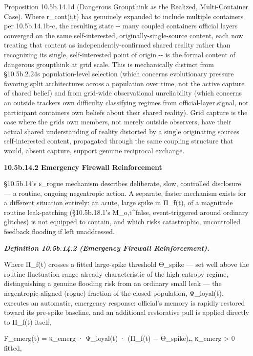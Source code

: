 \documentclass[
]{article}
\begin{document}
Proposition 10.5b.14.1d (Dangerous Groupthink as the Realized,
Multi-Container Case). Where r\_cont(i,t) has genuinely expanded to
include multiple containers per 10.5b.14.1b-c, the resulting state -\/-
many coupled containers official layers converged on the same
self-interested, originally-single-source content, each now treating
that content as independently-confirmed shared reality rather than
recognizing its single, self-interested point of origin -\/- is the
formal content of dangerous groupthink at grid scale. This is
mechanically distinct from §10.5b.2.24s population-level selection
(which concerns evolutionary pressure favoring split architectures
across a population over time, not the active capture of shared belief)
and from grid-wide observational unreliability (which concerns an
outside trackers own difficulty classifying regimes from official-layer
signal, not participant containers own beliefs about their shared
reality). Grid capture is the case where the grids own members, not
merely outside observers, have their actual shared understanding of
reality distorted by a single originating sources self-interested
content, propagated through the same coupling structure that would,
absent capture, support genuine reciprocal exchange.

\textbf{10.5b.14.2 Emergency Firewall Reinforcement}

§10.5b.14's ε\_rogue mechanism describes deliberate, slow, controlled
disclosure --- a routine, ongoing negentropic action. A separate, faster
mechanism exists for a different situation entirely: an acute, large
spike in Π\_f(t), of a magnitude routine leak-patching (§10.5b.18.1's
M\_o,t\^{}false, event-triggered around ordinary glitches) is not
equipped to contain, and which risks catastrophic, uncontrolled feedback
flooding if left unaddressed.

\emph{\textbf{Definition 10.5b.14.2 (Emergency Firewall
Reinforcement).}}

Where Π\_f(t) crosses a fitted large-spike threshold Θ\_spike --- set
well above the routine fluctuation range already characteristic of the
high-entropy regime, distinguishing a genuine flooding risk from an
ordinary small leak --- the negentropic-aligned (rogue) fraction of the
closed population, Ψ\_loyal(t), executes an automatic, emergency
response: official's memory is rapidly restored toward its pre-spike
baseline, and an additional restorative pull is applied directly to
Π\_f(t) itself,

F\_emerg(t) = κ\_emerg · Ψ\_loyal(t) · (Π\_f(t) − Θ\_spike)₊, κ\_emerg
\textgreater{} 0 fitted,
\end{document}
